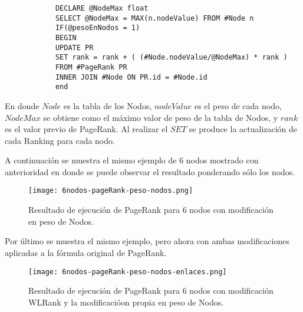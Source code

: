 	\tiny{
		\begin{verbatim}
			DECLARE @NodeMax float
			SELECT @NodeMax = MAX(n.nodeValue) FROM #Node n			
			IF(@pesoEnNodos = 1)
			BEGIN
			UPDATE PR 
			SET rank = rank + ( (#Node.nodeValue/@NodeMax) * rank )
			FROM #PageRank PR
			INNER JOIN #Node ON PR.id = #Node.id
			end
		\end{verbatim}
	}

En donde $Node$ es la tabla de los Nodos, $nodeValue$ es el peso de cada nodo, $NodeMax$ se obtiene como el máximo valor de peso de la tabla de Nodos, y $rank$ es el valor previo de PageRank. Al realizar el $SET$ se produce la actualización de cada Ranking para cada nodo. 

A continuación se muestra el mismo ejemplo de 6 nodos mostrado con anterioridad en donde se puede observar el resultado ponderando sólo los nodos.

\begin{figure}
	\centering
	\texttt{[image: 6nodos-pageRank-peso-nodos.png]}
	\caption{Resultado de ejecución de PageRank para 6 nodos con modificación en peso de Nodos.} 
	\label{fig:6nodos-pageRank-peso-nodos}
\end{figure}

Por último se muestra el mismo ejemplo, pero ahora con ambas modificaciones aplicadas a la fórmula original de PageRank.

\begin{figure}
	\centering
	\texttt{[image: 6nodos-pageRank-peso-nodos-enlaces.png]}
	\caption{Resultado de ejecución de PageRank para 6 nodos con modificación WLRank y la modificacióon propia en peso de Nodos.} 
	\label{fig:6nodos-pageRank-peso-nodos-enlaces}
\end{figure}

